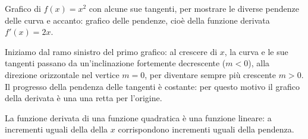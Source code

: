 
Grafico di \(f(x)=x^2\) con alcune sue tangenti, per mostrare le 
diverse pendenze delle curva e accanto: grafico delle pendenze, cioè della 
funzione derivata \(f'(x)=2x\).

Iniziamo dal ramo sinistro del primo grafico: al crescere di \(x\), 
la curva e le sue tangenti passano da un'inclinazione fortemente 
decrescente (\(m<0\)), alla direzione orizzontale nel vertice \(m=0\), 
per diventare sempre più crescente \(m>0\).
Il progresso della pendenza delle tangenti è costante: 
per questo motivo il grafico della derivata è una
una retta per l'origine.

\begin{osservazione}
La funzione derivata di una funzione quadratica è una funzione 
lineare: 
a incrementi uguali della della \(x\) corrispondono incrementi uguali
della pendenza.
\end{osservazione}

